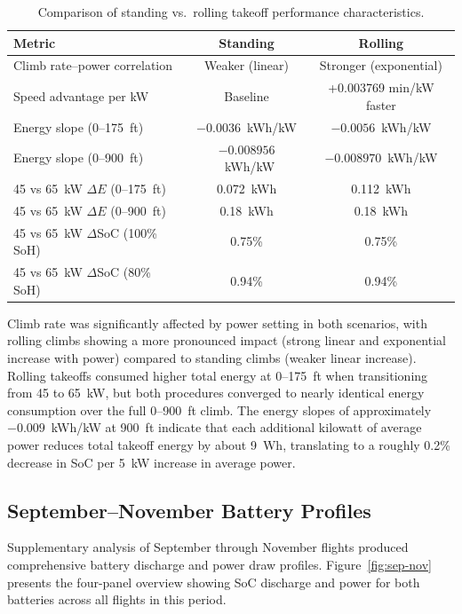 \documentclass[11pt,a4paper]{article}
\begin{document}
\begin{table}[H]
    \centering
    \caption{Comparison of standing vs.\ rolling takeoff performance characteristics.}
    \label{tab:standing-rolling}
    \begin{tabular}{lcc}
        \toprule
        \textbf{Metric} & \textbf{Standing} & \textbf{Rolling} \\
        \midrule
        Climb rate--power correlation & Weaker (linear) & Stronger (exponential) \\
        Speed advantage per kW & Baseline & +0.003769 min/kW faster \\
        Energy slope (0--175~ft) & $-0.0036$~kWh/kW & $-0.0056$~kWh/kW \\
        Energy slope (0--900~ft) & $-0.008956$~kWh/kW & $-0.008970$~kWh/kW \\
        45 vs 65~kW $\Delta E$ (0--175~ft) & 0.072~kWh & 0.112~kWh \\
        45 vs 65~kW $\Delta E$ (0--900~ft) & 0.18~kWh & 0.18~kWh \\
        45 vs 65~kW $\Delta$SoC (100\% SoH) & 0.75\% & 0.75\% \\
        45 vs 65~kW $\Delta$SoC (80\% SoH) & 0.94\% & 0.94\% \\
        \bottomrule
    \end{tabular}
\end{table}

Climb rate was significantly affected by power setting in both scenarios, with rolling climbs showing a more pronounced impact (strong linear and exponential increase with power) compared to standing climbs (weaker linear increase).
Rolling takeoffs consumed higher total energy at 0--175~ft when transitioning from 45 to 65~kW, but both procedures converged to nearly identical energy consumption over the full 0--900~ft climb.
The energy slopes of approximately $-0.009$~kWh/kW at 900~ft indicate that each additional kilowatt of average power reduces total takeoff energy by about 9~Wh, translating to a roughly 0.2\% decrease in SoC per 5~kW increase in average power.

\subsection{September--November Battery Profiles}

Supplementary analysis of September through November flights produced comprehensive battery discharge and power draw profiles.
Figure~\ref{fig:sep-nov} presents the four-panel overview showing SoC discharge and power for both batteries across all flights in this period.
\end{document}
